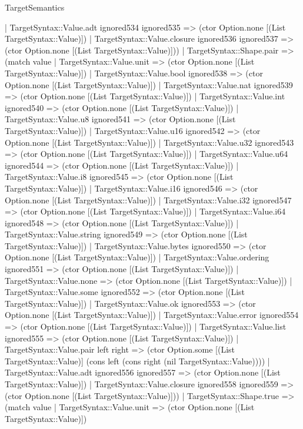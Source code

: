 \begin{lexlean}{TargetSemantics}
\begin{semanticmodule}
{      | TargetSyntax::Value.adt ignored534 ignored535 => (ctor Option.none [(List TargetSyntax::Value)])
      | TargetSyntax::Value.closure ignored536 ignored537 => (ctor Option.none [(List TargetSyntax::Value)]))
    | TargetSyntax::Shape.pair => (match value
      | TargetSyntax::Value.unit => (ctor Option.none [(List TargetSyntax::Value)])
      | TargetSyntax::Value.bool ignored538 => (ctor Option.none [(List TargetSyntax::Value)])
      | TargetSyntax::Value.nat ignored539 => (ctor Option.none [(List TargetSyntax::Value)])
      | TargetSyntax::Value.int ignored540 => (ctor Option.none [(List TargetSyntax::Value)])
      | TargetSyntax::Value.u8 ignored541 => (ctor Option.none [(List TargetSyntax::Value)])
      | TargetSyntax::Value.u16 ignored542 => (ctor Option.none [(List TargetSyntax::Value)])
      | TargetSyntax::Value.u32 ignored543 => (ctor Option.none [(List TargetSyntax::Value)])
      | TargetSyntax::Value.u64 ignored544 => (ctor Option.none [(List TargetSyntax::Value)])
      | TargetSyntax::Value.i8 ignored545 => (ctor Option.none [(List TargetSyntax::Value)])
      | TargetSyntax::Value.i16 ignored546 => (ctor Option.none [(List TargetSyntax::Value)])
      | TargetSyntax::Value.i32 ignored547 => (ctor Option.none [(List TargetSyntax::Value)])
      | TargetSyntax::Value.i64 ignored548 => (ctor Option.none [(List TargetSyntax::Value)])
      | TargetSyntax::Value.string ignored549 => (ctor Option.none [(List TargetSyntax::Value)])
      | TargetSyntax::Value.bytes ignored550 => (ctor Option.none [(List TargetSyntax::Value)])
      | TargetSyntax::Value.ordering ignored551 => (ctor Option.none [(List TargetSyntax::Value)])
      | TargetSyntax::Value.none => (ctor Option.none [(List TargetSyntax::Value)])
      | TargetSyntax::Value.some ignored552 => (ctor Option.none [(List TargetSyntax::Value)])
      | TargetSyntax::Value.ok ignored553 => (ctor Option.none [(List TargetSyntax::Value)])
      | TargetSyntax::Value.error ignored554 => (ctor Option.none [(List TargetSyntax::Value)])
      | TargetSyntax::Value.list ignored555 => (ctor Option.none [(List TargetSyntax::Value)])
      | TargetSyntax::Value.pair left right => (ctor Option.some [(List TargetSyntax::Value)] (cons left (cons right (nil TargetSyntax::Value))))
      | TargetSyntax::Value.adt ignored556 ignored557 => (ctor Option.none [(List TargetSyntax::Value)])
      | TargetSyntax::Value.closure ignored558 ignored559 => (ctor Option.none [(List TargetSyntax::Value)]))
    | TargetSyntax::Shape.true => (match value
      | TargetSyntax::Value.unit => (ctor Option.none [(List TargetSyntax::Value)])
}
\end{semanticmodule}
\end{lexlean}
